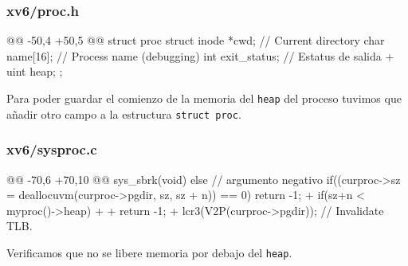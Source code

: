 \subsubsection{xv6/proc.h}
\begin{listing}
@@ -50,4 +50,5 @@ struct proc {
        struct inode *cwd;           // Current directory
        char name[16];               // Process name (debugging)
        int exit_status;             // Estatus de salida
+       uint heap;   
    };
\end{listing}
\par Para poder guardar el comienzo de la memoria del \texttt{heap} del proceso tuvimos que añadir otro campo a la estructura \texttt{struct proc}.

\newpage

\subsubsection{xv6/sysproc.c}
\begin{listing}
@@ -70,6 +70,10 @@ sys_sbrk(void)
    else // argumento negativo
    {
        if((curproc->sz = deallocuvm(curproc->pgdir, sz, sz + n)) == 0)
            return -1;
+       if(sz+n < myproc()->heap)
+       {
+           return -1;
+       }
    }
    lcr3(V2P(curproc->pgdir));  // Invalidate TLB.
\end{listing}

\par Verificamos que no se libere memoria por debajo del \texttt{heap}.